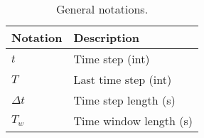 \begin{table*}[!htb]
\centering
\caption{General notations.}
\label{tab:notation_system}
\begin{tabular}{l|l}
    \hline
    Notation & Description \\\hline\hline
    $t$ & Time step (int)\\
    $T$ & Last time step (int)\\
    $\Delta t$ & Time step length (s)\\
    $T_{w}$ & Time window length (s)\\
    \hline
\end{tabular}
\end{table*}